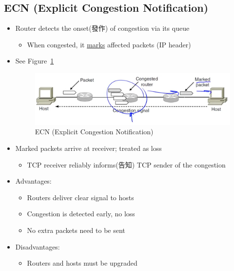 \documentclass[12pt]{ctexart}   %
\begin{document}
	\subsection{ECN (Explicit Congestion Notification)}
	\begin{itemize}
		\item Router detects the onset(發作) of congestion via its queue
		\begin{itemize}
			\item When congested, it \underline{marks} affected packets (IP header)
		\end{itemize}
		\item See Figure~\ref{fig:7-8-3}
		  
		 \begin{figure}[h!] %
		\centering
		 \includegraphics[scale=0.7]{images/7-8-3}
		\caption{ ECN (Explicit Congestion Notification) }
		 \label{fig:7-8-3}
		 \end{figure}
		 
		 \item Marked packets arrive at receiver; treated as loss
		 \begin{itemize}
		 	\item TCP receiver reliably informs(告知) TCP sender of the congestion
		 \end{itemize}
		 
		 \item Advantages:
		 \begin{itemize}
		 	\item Routers deliver clear signal to hosts
		 	\item Congestion is detected early, no loss
		 	\item No extra packets need to be sent
		 \end{itemize}
		 
		 \item Disadvantages:
		 \begin{itemize}
		 	\item Routers and hosts must be upgraded
		 \end{itemize}
	\end{itemize}
	
\end{document}
